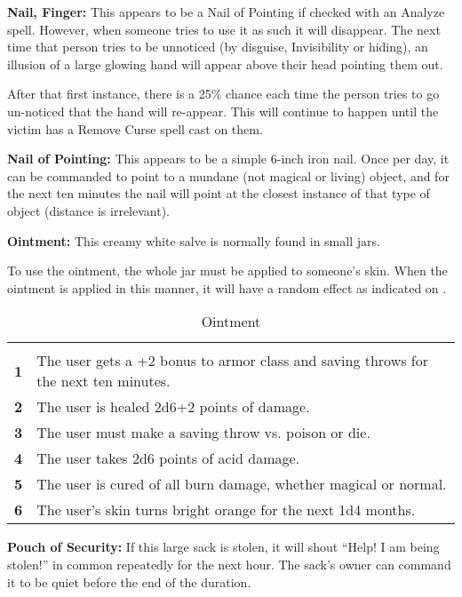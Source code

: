 \begin{multicols*}{2}
\textbf{Nail, Finger:} This appears to be a Nail of Pointing if checked with an Analyze spell. However, when someone tries to use it as such it will disappear. The next time that person tries to be unnoticed (by disguise, Invisibility or hiding), an illusion of a large glowing hand will appear above their head pointing them out.

After that first instance, there is a 25\% chance each time the person tries to go un-noticed that the hand will re-appear. This will continue to happen until the victim has a Remove Curse spell cast on them.

\textbf{Nail of Pointing:} This appears to be a simple 6-inch iron nail. Once per day, it can be commanded to point to a mundane (not magical or living) object, and for the next ten minutes the nail will point at the closest instance of that type of object (distance is irrelevant).

\textbf{Ointment:} This creamy white salve is normally found in small jars.

To use the ointment, the whole jar must be applied to someone’s skin. When the ointment is applied in this manner, it will have a random effect as indicated on .

\begin {table}[H]
  \caption{Ointment}\label{tab:Ointment}
  \begin{tabularx}{\columnwidth}{>{\bfseries}cY}
	 & \\
	1 & The user gets a +2 bonus to armor class and saving throws for the next ten minutes.\\
	2 & The user is healed 2d6+2 points of damage.\\
	3 & The user must make a saving throw vs. poison or die.\\
	4 & The user takes 2d6 points of acid damage.\\
	5 & The user is cured of all burn damage, whether magical or normal.\\
	6 & The user’s skin turns bright orange for the next 1d4 months.
  \end {tabularx}
\end {table}

\textbf{Pouch of Security:} If this large sack is stolen, it will shout “Help! I am being stolen!” in common repeatedly for the next hour. The sack’s owner can command it to be quiet before the end of the duration.


\end{multicols*}
